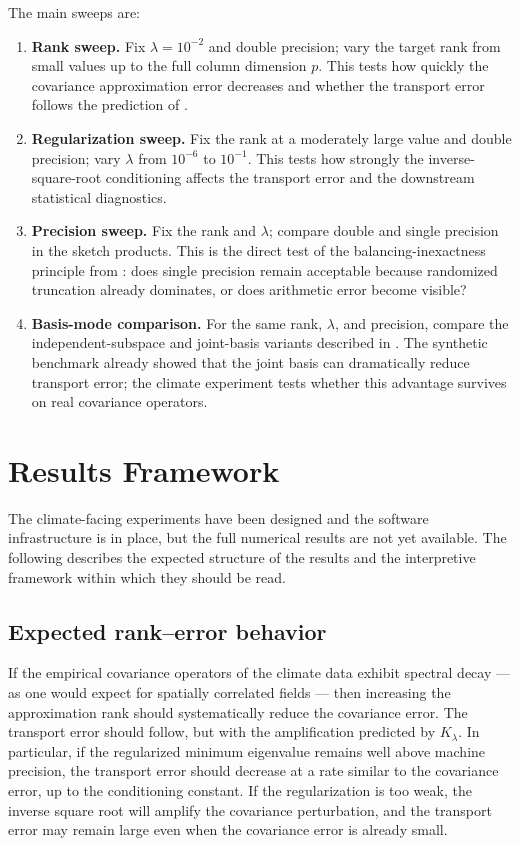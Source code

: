 The main sweeps are:
\begin{enumerate}
	\item \textbf{Rank sweep.} Fix \(\lambda = 10^{-2}\) and double precision; vary
	      the target rank from small values up to the full column dimension \(p\).
	      This tests how quickly the covariance approximation error decreases and
	      whether the transport error follows the prediction of
	      .
	\item \textbf{Regularization sweep.} Fix the rank at a moderately large value
	      and double precision; vary \(\lambda\) from \(10^{-6}\) to
	      \(10^{-1}\). This tests how strongly the inverse-square-root
	      conditioning affects the transport error and the downstream
	      statistical diagnostics.
	\item \textbf{Precision sweep.} Fix the rank and \(\lambda\); compare double
	      and single precision in the sketch products. This is the direct test of
	      the balancing-inexactness principle from : does
	      single precision remain acceptable because randomized truncation already
	      dominates, or does arithmetic error become visible?
	\item \textbf{Basis-mode comparison.} For the same rank, \(\lambda\), and
	      precision, compare the independent-subspace and joint-basis variants
	      described in . The synthetic benchmark
	      already showed that the joint basis can dramatically reduce transport
	      error; the climate experiment tests whether this advantage survives on
	      real covariance operators.
\end{enumerate}

\section{Results Framework}

The climate-facing experiments have been designed
and the software infrastructure is in place, but the full numerical results are not
yet available. The following describes the expected structure of the results and the
interpretive framework within which they should be read.

\subsection{Expected rank--error behavior}

If the empirical covariance operators of the climate data exhibit spectral decay
--- as one would expect for spatially correlated fields --- then increasing the
approximation rank should systematically reduce the covariance error. The transport
error should follow, but with the amplification predicted by \(K_\lambda\). In
particular, if the regularized minimum eigenvalue remains well above machine
precision, the transport error should decrease at a rate similar to the covariance
error, up to the conditioning constant. If the regularization is too weak, the
inverse square root will amplify the covariance perturbation, and the transport
error may remain large even when the covariance error is already small.

